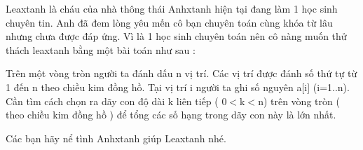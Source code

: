 Leaxtanh là cháu của nhà thông thái Anhxtanh hiện tại đang làm 1 học sinh chuyên tin. Anh đã đem lòng yêu mến cô bạn chuyên toán cùng khóa từ lâu nhưng chưa được đáp ứng. Vì là 1 học sinh chuyên toán nên cô nàng muốn thử thách leaxtanh bằng một bài toán như sau :

Trên một vòng tròn người ta đánh dấu n vị trí. Các vị trí được đánh số thứ tự từ 1 đến n theo chiều kim đồng hồ. Tại vị trí i người ta ghi số nguyên a[i] (i=1..n). Cần tìm cách chọn ra dãy con độ dài k liên tiếp ( 0$<$k$<$n) trên vòng tròn ( theo chiều kim đồng hồ ) để tổng các số hạng trong dãy con này là lớn nhất.

Các bạn hãy nể tình Anhxtanh giúp Leaxtanh nhé.